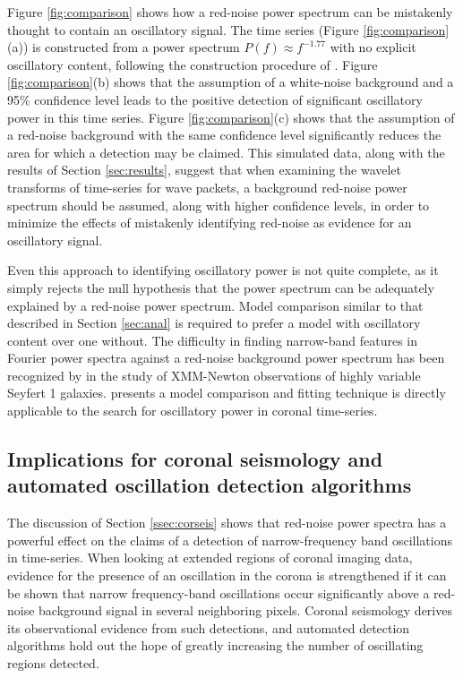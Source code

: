 \documentclass[preprint]{../aastex52/aastex}
\begin{document}
Figure \ref{fig:comparison} shows how a red-noise power spectrum can
be mistakenly thought to contain an oscillatory signal.  The time
series (Figure \ref{fig:comparison}(a)) is constructed from a power
spectrum $P(f)\approx f^{-1.77}$ with no explicit oscillatory content,
following the construction procedure of \cite{vaughan2010}.  Figure
\ref{fig:comparison}(b) shows that the assumption of a white-noise
background and a 95\% confidence level leads to the positive detection
of significant oscillatory power in this time series. Figure
\ref{fig:comparison}(c) shows that the assumption of a red-noise
background with the same confidence level significantly reduces the
area for which a detection may be claimed.  This simulated data, along
with the results of Section \ref{sec:results}, suggest that when
examining the wavelet transforms of time-series for wave packets, a
background red-noise power spectrum should be assumed, along with
higher confidence levels, in order to minimize the effects of
mistakenly identifying red-noise as evidence for an oscillatory
signal.

Even this approach to identifying oscillatory power is not quite
complete, as it simply rejects the null hypothesis that the power
spectrum can be adequately explained by a red-noise power spectrum.
Model comparison similar to that described in Section \ref{sec:anal}
is required to prefer a model with oscillatory content over one
without. The difficulty in finding narrow-band features in Fourier
power spectra against a red-noise background power spectrum has been
recognized by \cite{2010MNRAS.402..307V} in the study of XMM-Newton
observations of highly variable Seyfert 1 galaxies.
\cite{2010MNRAS.402..307V} presents a model comparison and fitting
technique is directly applicable to the search for oscillatory power
in coronal time-series.


\subsection{Implications for coronal seismology and automated
  oscillation detection algorithms}\label{sec:oscdetect}

The discussion of Section \ref{ssec:corseis} shows that red-noise
power spectra has a powerful effect on the claims of a detection of
narrow-frequency band oscillations in time-series.  When looking at
extended regions of coronal imaging data, evidence for the presence of
an oscillation in the corona is strengthened if it can be shown that
narrow frequency-band oscillations occur significantly above a
red-noise background signal in several neighboring pixels.  Coronal
seismology derives its observational evidence from such detections,
and automated detection algorithms hold out the hope of greatly
increasing the number of oscillating regions detected.
\end{document}
